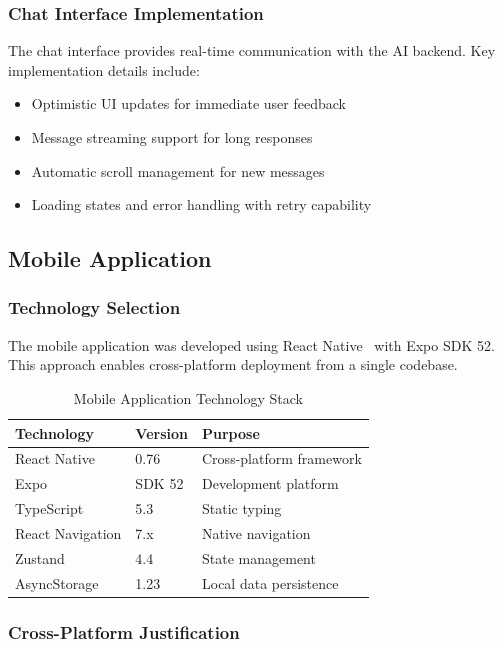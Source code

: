 \subsubsection{Chat Interface Implementation}

The chat interface provides real-time communication with the AI backend. Key implementation details include:

\begin{itemize}
    \item Optimistic UI updates for immediate user feedback
    \item Message streaming support for long responses
    \item Automatic scroll management for new messages
    \item Loading states and error handling with retry capability
\end{itemize}

\subsection{Mobile Application}

\subsubsection{Technology Selection}

The mobile application was developed using React Native~\cite{reactnative} with Expo SDK 52. This approach enables cross-platform deployment from a single codebase.

\begin{table}[h]
\centering
\caption{Mobile Application Technology Stack}
\label{tab:mobile-stack}
\begin{tabular}{@{}lll@{}}
\toprule
Technology & Version & Purpose \\
\midrule
React Native & 0.76 & Cross-platform framework \\
Expo & SDK 52 & Development platform \\
TypeScript & 5.3 & Static typing \\
React Navigation & 7.x & Native navigation \\
Zustand & 4.4 & State management \\
AsyncStorage & 1.23 & Local data persistence \\
\bottomrule
\end{tabular}
\end{table}

\subsubsection{Cross-Platform Justification}

